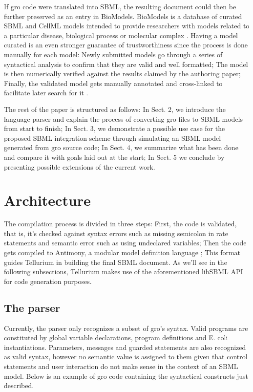 \documentclass[12pt]{article}
\begin{document}
    If gro code were translated into SBML, the resulting document could then be further preserved as an entry in BioModels. BioModels is a database of curated SBML and CellML models intended to provide researchers with models related to a particular disease, biological process or molecular complex \cite{LeNovere2006}. Having a model curated is an even stronger guarantee of trustworthiness since the process is done manually for each model: Newly submitted models go through a series of syntactical analysis to confirm that they are valid and well formatted; The model is then numerically verified against the results claimed by the authoring paper; Finally, the validated model gets manually annotated and cross-linked to facilitate later search for it \cite{LeNovere2006}.
    
    The rest of the paper is structured as follows: In Sect. 2, we introduce the language parser and explain the process of converting gro files to SBML models from start to finish; In Sect. 3, we demonstrate a possible use case for the proposed SBML integration scheme through simulating an SBML model generated from gro source code; In Sect. 4, we summarize what has been done and compare it with goals laid out at the start; In Sect. 5 we conclude by presenting possible extensions of the current work.
    

\section{Architecture}

    
    The compilation process is divided in three steps: First, the code is validated, that is, it's checked against syntax errors such as missing semicolon in rate statements and semantic error such as using undeclared variables; Then the code gets compiled to Antimony, a modular model definition language \cite{Smith2009}; This format guides Tellurium in building the final SBML document. As we'll see in the following subsections, Tellurium makes use of the aforementioned libSBML API for code generation purposes.


\subsection{The parser}
    
    Currently, the parser only recognizes a subset of gro's syntax. Valid programs are constituted by global variable declarations, program definitions and E. coli instantiations. Parameters, messages and guarded statements are also recognized as valid syntax, however no semantic value is assigned to them given that control statements and user interaction do not make sense in the context of an SBML model. Below is an example of gro code containing the syntactical constructs just described.
    
\end{document}
